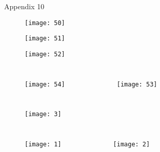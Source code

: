 \documentclass{beamer}
\begin{document}
\begin{frame}{{Appendix 10}}\hypertarget{10}{}

\begin{figure}
	\centering
	\texttt{[image: 50]}

		\texttt{[image: 51]}
	\caption{}
\end{figure}
\begin{figure}
	\centering

	\caption{}
	\label{fig:51}
\end{figure}
\end{frame}


\begin{frame}\hypertarget{11}{}
	\begin{figure}
		\centering
		\texttt{[image: 52]}
		\caption{}
	\end{figure}
\begin{columns}
	\begin{figure}
		\centering
		\texttt{[image: 54]}
		\caption{}
	\end{figure}
	\begin{figure}
		\centering
		\texttt{[image: 53]}
		\caption{}
	\end{figure}
\end{columns}
	\end{frame}
\begin{frame}\hypertarget{12}{}
	\begin{figure}
		\centering
		\texttt{[image: 3]}
		\caption{}
	\end{figure}
	\begin{columns}
		\begin{figure}
			\centering
			\texttt{[image: 1]}
		\end{figure}
		\begin{figure}
			\centering
			\texttt{[image: 2]}
		\end{figure}
	\end{columns}
\end{frame}
\end{document}
